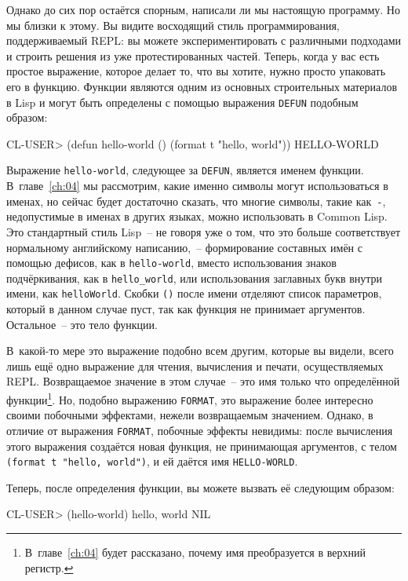 Однако до сих пор остаётся спорным, написали ли мы настоящую программу. Но мы близки к этому.
Вы видите восходящий стиль программирования, поддерживаемый REPL: вы можете
экспериментировать с различными подходами и строить решения из уже протестированных
частей. Теперь, когда у вас есть простое выражение, которое делает то, что вы хотите,
нужно просто упаковать его в функцию. Функции являются одним из основных строительных
материалов в Lisp и могут быть определены с помощью выражения \lstinline{DEFUN} подобным образом:

\begin{myverb}
CL-USER> (defun hello-world () (format t "hello, world"))
HELLO-WORLD
\end{myverb}

Выражение \lstinline{hello-world}, следующее за \lstinline{DEFUN}, является именем функции. В~главе~\ref{ch:04} мы
рассмотрим, какие именно символы могут использоваться в именах, но сейчас будет достаточно
сказать, что многие символы, такие как~\lstinline|-|, недопустимые в именах в других
языках, можно использовать в Common Lisp. Это стандартный стиль Lisp~-- не говоря уже о том,
что это больше соответствует нормальному английскому написанию,~-- формирование составных имён с помощью дефисов,
как в \lstinline{hello-world}, вместо использования знаков подчёркивания, как в \lstinline|hello_world|, или
использования заглавных букв внутри имени, как \lstinline{helloWorld}. Скобки \lstinline{()} после имени отделяют
список параметров, который в данном случае пуст, так как функция не принимает
аргументов. Остальное~-- это тело функции.

В~какой-то мере это выражение подобно всем другим, которые вы видели, всего лишь ещё одно
выражение для чтения, вычисления и печати, осуществляемых REPL. Возвращаемое значение в
этом случае~-- это имя только что определённой функции\footnote{В~главе~\ref{ch:04} будет
  рассказано, почему имя преобразуется в верхний регистр.}. Но, подобно выражению
\lstinline{FORMAT}, это выражение более интересно своими побочными эффектами, нежели
возвращаемым значением. Однако, в отличие от выражения \lstinline{FORMAT}, побочные
эффекты невидимы: после вычисления этого выражения создаётся новая функция, не принимающая
аргументов, с телом \lstinline{(format t "hello, world")}, и ей даётся имя
\lstinline{HELLO-WORLD}.

Теперь, после определения функции, вы можете вызвать её следующим образом:

\begin{myverb}
CL-USER> (hello-world)
hello, world
NIL
\end{myverb}


